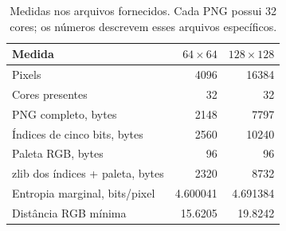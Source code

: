\begin{table}[htbp]
\centering\small
\begin{tabular}{lrr}
\toprule
Medida & $64\times64$ & $128\times128$\\
\midrule
Pixels & 4096 & 16384\\
Cores presentes & 32 & 32\\
PNG completo, bytes & 2148 & 7797\\
Índices de cinco bits, bytes & 2560 & 10240\\
Paleta RGB, bytes & 96 & 96\\
zlib dos índices + paleta, bytes & 2320 & 8732\\
Entropia marginal, bits/pixel & 4.600041 & 4.691384\\
Distância RGB mínima & 15.6205 & 19.8242\\
\bottomrule
\end{tabular}
\caption{Medidas nos arquivos fornecidos. Cada PNG possui 32 cores; os números descrevem esses arquivos específicos.}
\end{table}
